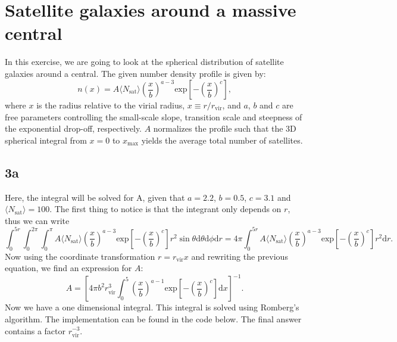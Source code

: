 \section{Satellite galaxies around a massive central}
In this exercise, we are going to look at the spherical distribution of satellite galaxies around a central. The given number density profile is given by:
\begin{equation}
  n(x) = A \langle N_\mathrm{sat}\rangle \left( \frac{x}{b} \right) ^{a-3} \mathrm{exp} \left[ - \left( \frac{x}{b} \right)^{c} \right],
\end{equation}
where $x$ is the radius relative to the virial radius, $x\equiv r/r_\mathrm{vir}$, and $a$, $b$ and $c$ are free parameters controlling the small-scale slope, transition scale and steepness of the exponential drop-off, respectively. $A$ normalizes the profile such that the 3D spherical integral from $x=0$ to $x_\mathrm{max}$ yields the average total number of satellites.

\subsection*{3a}
Here, the integral will be solved for A, given that $a = 2.2$, $b = 0.5$, $c = 3.1$ and $\langle N_\mathrm{sat}\rangle = 100$. The first thing to notice is that the integrant only depends on $r$, thus we can write
\begin{equation}
  \int_0^{5r} \int_0^{2\pi} \int_0^{\pi} A \langle N_\mathrm{sat}\rangle \left( \frac{x}{b} \right) ^{a-3} \mathrm{exp} \left[ - \left( \frac{x}{b} \right)^{c} \right] r^2 \sin\theta \mathrm{d}\theta \mathrm{d}\phi \mathrm{d}r = 4\pi \int_0^{5r} A \langle N_\mathrm{sat}\rangle \left( \frac{x}{b} \right) ^{a-3} \mathrm{exp} \left[ - \left( \frac{x}{b} \right)^{c} \right] r^2 \mathrm{d}r.
\end{equation}
Now using the coordinate transformation $r = r_{\mathrm{vir}}x$ and rewriting the previous equation, we find an expression for $A$:
\begin{equation}
  A = \left[ 4\pi b^2 r_{\mathrm{vir}}^3 \int_0^5 \left( \frac{x}{b} \right)^{a-1} \mathrm{exp} \left[ - \left( \frac{x}{b} \right)^{c} \right] \mathrm{d}x   \right]^{-1}.
\end{equation}
Now we have a one dimensional integral. This integral is solved using Romberg's algorithm. The implementation can be found in the code below. The final answer contains a factor $r_\mathrm{{vir}}^{-3}$.


